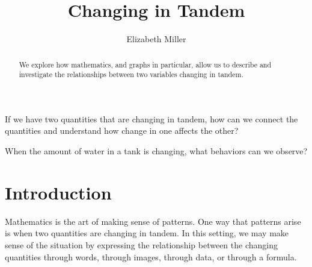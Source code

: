\documentclass{ximera}
\author{Elizabeth Miller}
\title{Changing in Tandem}
\begin{document}
\begin{abstract}
  We explore how mathematics, and graphs in particular, allow us to describe and investigate the relationships between two variables changing in tandem.
\end{abstract}
\maketitle



\begin{motivatingQuestions}
\item If we have two quantities that are changing in tandem, how can
  we connect the quantities and understand how change in one affects
  the other?
\item When the amount of water in a tank is changing, what behaviors
  can we observe?
\end{motivatingQuestions}



\section{Introduction}
Mathematics is the art of making sense of patterns.  One way that patterns arise is when two quantities are changing in tandem.  In this setting, we may make sense of the situation by expressing the relationship between the changing quantities through words, through images, through data, or through a formula.%
\end{document}
